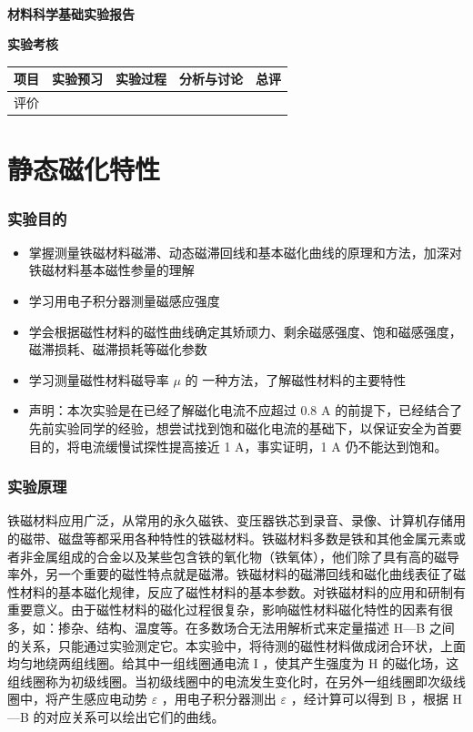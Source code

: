 \documentclass[a4paper,utf8]{article}
\begin{document}
\begin{center}
    {\mbox{}\\[7em]\bfseries\songti%
    材料科学基础实验报告}\\[34mm]
    {\bfseries\songti
    实验考核\\[3mm]
    \extrarowheight=3mm
    \begin{tabularx}{150mm}{|X|X|X|X|X|}\hline
        \hfil 项目 \hfil  & \hfil 实验预习 \hfil & \hfil 实验过程 \hfil & \hfil 分析与讨论 \hfil & \hfil 总评 \hfil \\[3mm] \hline
        \hfil 评价 \hfil &  &  &  &  \\[3mm] \hline
    \end{tabularx}
    }
\end{center}\newpage
\part{静态磁化特性}
\section{实验目的}
    \begin{itemize}
        \item 掌握测量铁磁材料磁滞、动态磁滞回线和基本磁化曲线的原理和方法，加深对铁磁材料基本磁性参量的理解 
        \item 学习用电子积分器测量磁感应强度
        \item 学会根据磁性材料的磁性曲线确定其矫顽力、剩余磁感强度、饱和磁感强度，磁滞损耗、磁滞损耗等磁化参数
        \item 学习测量磁性材料磁导率 $\mu$ 的 一种方法，了解磁性材料的主要特性
        \item 声明：本次实验是在已经了解磁化电流不应超过 0.8 A 的前提下，已经结合了先前实验同学的经验，想尝试找到饱和磁化电流的基础下，以保证安全为首要目的，将电流缓慢试探性提高接近 1 A，事实证明，1 A 仍不能达到饱和。
    \end{itemize}
\section{实验原理}%
    铁磁材料应用广泛，从常用的永久磁铁、变压器铁芯到录音、录像、计算机存储用的磁带、磁盘等都采用各种特性的铁磁材料。铁磁材料多数是铁和其他金属元素或者非金属组成的合金以及某些包含铁的氧化物（铁氧体），他们除了具有高的磁导率外，另一个重要的磁性特点就是磁滞。铁磁材料的磁滞回线和磁化曲线表征了磁性材料的基本磁化规律，反应了磁性材料的基本参数。对铁磁材料的应用和研制有重要意义。由于磁性材料的磁化过程很复杂，影响磁性材料磁化特性的因素有很多，如：掺杂、结构、温度等。在多数场合无法用解析式来定量描述 H—B 之间的关系，只能通过实验测定它。本实验中，将待测的磁性材料做成闭合环状，上面均匀地绕两组线圈。给其中一组线圈通电流 I ，使其产生强度为 H 的磁化场，这组线圈称为初级线圈。当初级线圈中的电流发生变化时，在另外一组线圈即次级线圈中，将产生感应电动势 $\varepsilon$ ，用电子积分器测出 $\varepsilon$ ，经计算可以得到 B ，根据 H—B 的对应关系可以绘出它们的曲线。
\end{document}
